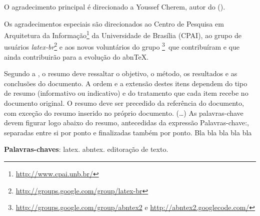\documentclass[
	12pt,				%
    oneside,			%
	a4paper,			%
	english,			%
	french,				%
	spanish,			%
	brazil,				%
	]{abntex2}
\begin{document}
\frenchspacing 


\imprimircapa

\imprimirfolhaderosto*


\begin{agradecimentos}
O agradecimento principal é direcionado a Youssef Cherem, autor do
 ().

Os agradecimentos especiais são direcionados ao Centro de Pesquisa em
Arquitetura da Informação\footnote{\url{http://www.cpai.unb.br/}} da Universidade de
Brasília (CPAI), ao grupo de usuários
\emph{latex-br}\footnote{\url{http://groups.google.com/group/latex-br}} e aos
novos voluntários do grupo
\emph{\abnTeX}\footnote{\url{http://groups.google.com/group/abntex2} e
\url{http://abntex2.googlecode.com/}}~que contribuíram e que ainda
contribuirão para a evolução do abn\TeX.

\end{agradecimentos}


\begin{resumo} %
 Segundo a , o resumo deve ressaltar o
 objetivo, o método, os resultados e as conclusões do documento. A ordem e a extensão
 destes itens dependem do tipo de resumo (informativo ou indicativo) e do
 tratamento que cada item recebe no documento original. O resumo deve ser
 precedido da referência do documento, com exceção do resumo inserido no
 próprio documento. (\ldots) As palavras-chave devem figurar logo abaixo do
 resumo, antecedidas da expressão Palavras-chave:, separadas entre si por
 ponto e finalizadas também por ponto. Bla bla bla bla bla \cite{fulano} %

 \vspace{\onelineskip}
    
 \noindent
 \textbf{Palavras-chaves}: latex. abntex. editoração de texto.
\end{resumo} %
\end{document}
